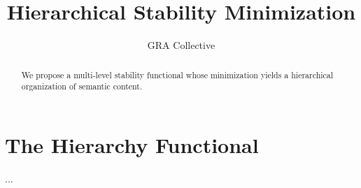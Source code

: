\documentclass{article}
\title{Hierarchical Stability Minimization}
\author{GRA Collective}
\begin{document}
\maketitle
\begin{abstract}
We propose a multi-level stability functional whose minimization yields a hierarchical organization of semantic content.
\end{abstract}
\section{The Hierarchy Functional}
...
\end{document}
